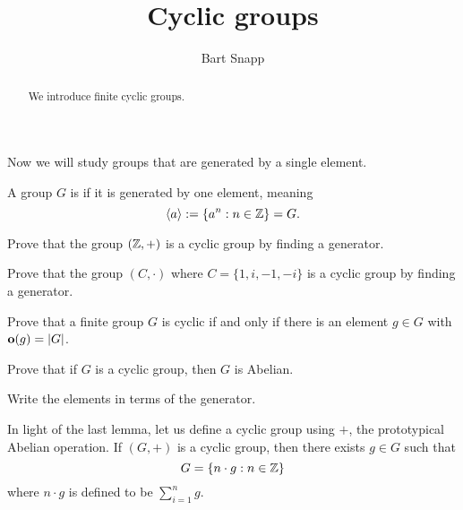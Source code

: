 \documentclass{ximera}
\author{Bart Snapp}
\title{Cyclic groups}
\begin{document}
\begin{abstract}
  We introduce finite cyclic groups.
\end{abstract}
\maketitle

Now we will study groups that are generated by a single element. 

\begin{definition}
  A group $G$ is  if it is generated by one element,
  meaning
  \[
  \langle a\rangle := \{a^n:n\in \mathbb Z\} = G.
  \]
\end{definition}


\begin{exercise}
  Prove that the group $(\mathbb Z,+)$ is a cyclic group by finding a
  generator.
\end{exercise}


\begin{exercise}
  Prove that the group $(C,\cdot)$ where $C=\{1,i,-1,-i\}$ is a cyclic
  group by finding a generator.
\end{exercise}


\begin{exercise}
  Prove that a finite group $G$ is cyclic if and only if there is an element
  $g\in G$ with $\mathbf o(g) = |G|$.
\end{exercise}



\begin{lemma}
  Prove that if $G$ is a cyclic group, then $G$ is Abelian.
  \begin{sketch}
    Write the elements in terms of the generator.
  \end{sketch}
\end{lemma}

In light of the last lemma, let us define a cyclic group using $+$, the
prototypical Abelian operation. If $(G,+)$ is a cyclic group, then
there exists $g\in G$ such that
\[
G = \{n\cdot g: n\in \mathbb Z\}
\]
where $n\cdot g$ is defined to be $\sum_{i=1}^n g$.
\end{document}

